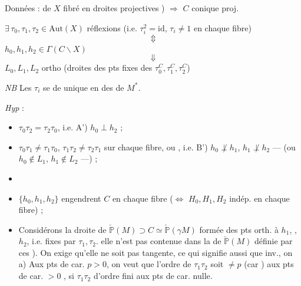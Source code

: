 \documentclass[11pt,a4paper]{article}
\begin{document}

Données :  de $X$ fibré en droites projectives ) $\Rightarrow$ $C$ conique proj.

$\exists\, \tau_0, \tau_1, \tau_2 \in \mathrm{Aut}(X)$ réflexions (i.e. $\tau_i^2 = \mathrm{id}$, $\tau_i \neq 1$ en chaque fibre)
\[
  \Updownarrow
\]
$h_0, h_1, h_2 \in \Gamma(C \smallsetminus X)$
\[
  \Downarrow
\]
$L_0, L_1, L_2$ ortho (droites des pts fixes des $\tau_0^C, \tau_1^C, \tau_2^C$)

\emph{NB} Les $\tau_i$ se  de  unique \struck{\ill{}}  en des  \struck{\ill{}} de $M^{*}$.

\emph{Hyp} :
\begin{itemize}
  \item[A)] $\tau_0\tau_2 = \tau_2\tau_0$, i.e. A') $h_0 \perp h_2$ ;
  \item[B)] $\tau_0\tau_1 \neq \tau_1\tau_0$, $\tau_1\tau_2 \neq \tau_2\tau_1$ sur chaque fibre, ou , i.e. B') $h_0 \not\perp h_1$, $h_1 \not\perp h_2$ --- (ou $h_0 \notin L_1$, $h_1 \notin L_2$ ---) ;
  \item[]  
  \item[C)] $\{h_0, h_1, h_2\}$ engendrent  $C$ en chaque fibre ($\Leftrightarrow$ $H_0, H_1, H_2$ indép. en chaque fibre) ;
  \item[D)] Considérons la droite  de $\check{\mathbb{P}}(M) \supset C \simeq \check{\mathbb{P}}(\gamma M)$ formée des pts orth. à $h_1$, \struck{\ill{}}, $h_2$, i.e. fixes par $\tau_1, \tau_2$.   elle n'est pas contenue dans la  \ill{} de $\check{\mathbb{P}}(M)$ définie par ces  \ill{}). On exige qu'elle ne soit pas  tangente, ce qui signifie aussi que  inv., on \ill{} a) Aux pts  de car.  $p > 0$, on veut que l'ordre de $\tau_1\tau_2$ soit $\neq p$ (car \ill{} \ill{} \struck{\ill{}}  \struck{\ill{}}) \ill{} aux pts de car. $> 0$ \struck{\ill{}}, \ill{} si $\tau_1\tau_2$ d'ordre fini \ill{} \add{\ill{}} aux pts de car. nulle.
\end{itemize}
\end{document}
